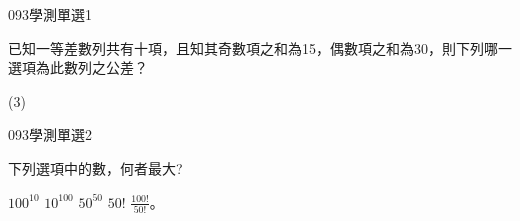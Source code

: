 \begin{QUESTIONS}
    \begin{QUESTION}
        \begin{ExamInfo}{093}{學測}{單選}{1}
        \end{ExamInfo}
        \begin{ExamAnsRateInfo}{71}{93}{79}{41}
        \end{ExamAnsRateInfo}
        \begin{QBODY}
            已知一等差數列共有十項，且知其奇數項之和為15，偶數項之和為30，則下列哪一選項為此數列之公差？ 
            \begin{QOPS} 
            \end{QOPS}
        \end{QBODY}
        \begin{QFROMS}
        \end{QFROMS}
        \begin{QTAGS}\end{QTAGS}
        \begin{QANS}
            (3)
        \end{QANS}
        \begin{QSOLLIST}
        \end{QSOLLIST}
        \begin{QEMPTYSPACE}
        \end{QEMPTYSPACE}
    \end{QUESTION}
    \begin{QUESTION}
        \begin{ExamInfo}{093}{學測}{單選}{2}
        \end{ExamInfo}
        \begin{ExamAnsRateInfo}{60}{85}{62}{33}
        \end{ExamAnsRateInfo}
        \begin{QBODY}
            下列選項中的數，何者最大? 
            \begin{QOPS} 
                \QOP $100^{10}$ 
                \QOP $10^{100}$ 
                \QOP $50^{50} $
                \QOP $50!$ 
                \QOP $\frac{100!}{50!}$。 
            \end{QOPS}
        \end{QBODY}
        \begin{QFROMS}
        \end{QFROMS}

\end{QUESTION}
\end{QUESTIONS}
